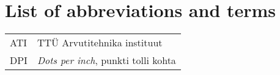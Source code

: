 \section*{List of abbreviations and terms}

\begin{tabular}{p{3cm}p{11cm}}
  ATI&TTÜ Arvutitehnika instituut\\
  DPI&\textit{Dots per inch}, punkti tolli kohta

\end{tabular}
\pagebreak
